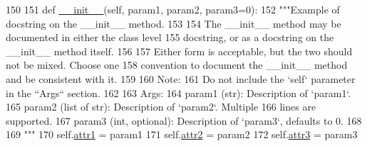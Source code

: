 \begin{DoxyCode}
150 
151     \textcolor{keyword}{def }\hyperlink{classgoogle__docstring__example_1_1ExampleClass_a6fde9c776090979b1bdd97ab905cdebf}{\_\_init\_\_}(self, param1, param2, param3=0):
152         \textcolor{stringliteral}{"""Example of docstring on the \_\_init\_\_ method.}
153 \textcolor{stringliteral}{}
154 \textcolor{stringliteral}{        The \_\_init\_\_ method may be documented in either the class level}
155 \textcolor{stringliteral}{        docstring, or as a docstring on the \_\_init\_\_ method itself.}
156 \textcolor{stringliteral}{}
157 \textcolor{stringliteral}{        Either form is acceptable, but the two should not be mixed. Choose one}
158 \textcolor{stringliteral}{        convention to document the \_\_init\_\_ method and be consistent with it.}
159 \textcolor{stringliteral}{}
160 \textcolor{stringliteral}{        Note:}
161 \textcolor{stringliteral}{          Do not include the `self` parameter in the ``Args`` section.}
162 \textcolor{stringliteral}{}
163 \textcolor{stringliteral}{        Args:}
164 \textcolor{stringliteral}{          param1 (str): Description of `param1`.}
165 \textcolor{stringliteral}{          param2 (list of str): Description of `param2`. Multiple}
166 \textcolor{stringliteral}{            lines are supported.}
167 \textcolor{stringliteral}{          param3 (int, optional): Description of `param3`, defaults to 0.}
168 \textcolor{stringliteral}{}
169 \textcolor{stringliteral}{        """}
170         self.\hyperlink{classgoogle__docstring__example_1_1ExampleClass_a6fa2ed2716c1ae7ec406eeb02329d652}{attr1} = param1
171         self.\hyperlink{classgoogle__docstring__example_1_1ExampleClass_aeace93f22e79d4dbb60e1bac15b149fa}{attr2} = param2
172         self.\hyperlink{classgoogle__docstring__example_1_1ExampleClass_a0425bdc97a8a3e22a92aeb40aa9f9416}{attr3} = param3

\end{DoxyCode}


